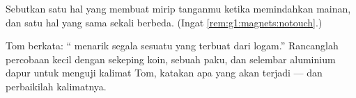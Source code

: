 \begin{exercise}[$\star$]\label{exo:g1:magnets:8}
Sebutkan satu hal yang membuat  mirip tanganmu ketika
memindahkan mainan, dan satu hal yang sama sekali berbeda. (Ingat
\cref{rem:g1:magnets:notouch}.)
\end{exercise}

\begin{exercise}[$\star\star$]\label{exo:g1:magnets:9}
Tom berkata: `` menarik segala sesuatu yang terbuat dari logam.''
Rancanglah percobaan kecil dengan sekeping koin, sebuah paku, dan
selembar aluminium dapur untuk menguji kalimat Tom, katakan apa yang
akan terjadi --- dan perbaikilah kalimatnya.
\end{exercise}
